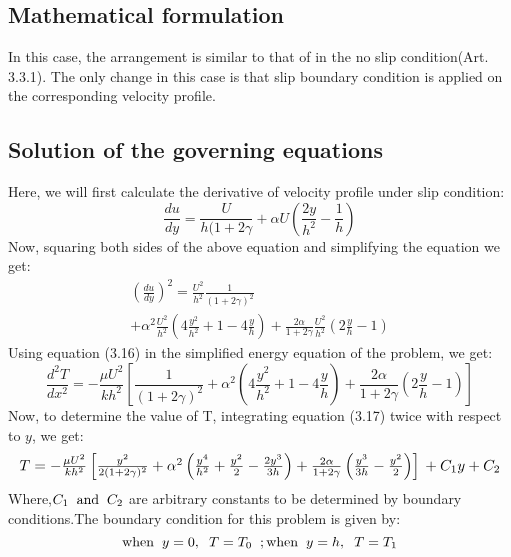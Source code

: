 \documentclass[14pt,one side, a4paper]{extbook}
\begin{document}
	 	\subsection{Mathematical formulation}
	 	In this case, the arrangement is similar to that of in the no slip condition(Art. 3.3.1). The only change in this case is that slip boundary condition is applied on the corresponding velocity profile.
	 	\subsection{Solution of the governing equations} Here, we will first calculate the derivative of velocity profile under slip condition:
	 	\begin{equation}
	 		\frac{du}{dy}=\frac{U}{h(1+2\gamma}+\alpha U\left(\frac{2y}{h^{2}}-\frac{1}{h}\right)
	 	\end{equation}
	 	 Now, squaring both sides of the above equation and simplifying the equation we get:
	 	 \begin{multline}
	 	 	\left(\frac{du}{dy}\right)^{2}=\frac{U^{2}}{h^{2}}\frac{1}{(1+2\gamma)^{2}} \\ +\alpha^{2}\frac{U^{2}}{h^{2}}\left(4\frac{y^{2}}{h^{2}}+1-4\frac{y}{h}\right)+\frac{2\alpha}{1+2\gamma}\frac{U^{2}}{h^{2}}\left(2\frac{y}{h}-1\right)
	 	 \end{multline}
	 	 Using equation (3.16) in the simplified energy equation of the problem, we get:
	 	 \begin{equation}
	 	 \frac{d^{2}T}{d x^{2}}=-\frac{\mu U^{2}}{kh^{2}}\left[\frac{1}{(1+2\gamma)^{2}}+\alpha^{2}\left(4\frac{y^{2}}{h^{2}}+1-4\frac{y}{h}\right)+\frac{2\alpha}{1+2\gamma}\left(2\frac{y}{h}-1\right)\right]
	 	\end{equation}
	 	Now, to determine the value of T, integrating equation (3.17) twice with respect to $y$, we get:
	 	\begin{equation}
	 				\resizebox{1\hsize}{!}{$T=-\frac{\mu U^{2}}{kh^{2}}\left[\frac{y^{2}}{2(1+2\gamma )^{2}}+ \alpha ^{2}\left(\frac{y^{4}}{h^{2}}+\frac{y^{2}}{2}-\frac{2y^{3}}{3h}\right)+\frac{2\alpha}{1+2\gamma}\left(\frac{y^{3}}{3h}-\frac{y^{2}}{2}\right)\right]\\+C_{1}y+C_{2}$}
	 	\end{equation}
	 	Where,$C_{1}\hspace*{0.2cm}\textrm{and}\hspace*{0.2cm} C_{2}$ are arbitrary constants to be determined by boundary conditions.The boundary condition for this problem is given by:
	 		\begin{equation}
	 		\textrm{when}\hspace*{0.2cm} y=0,\hspace*{0.2cm}T=T_{0}\hspace{0.2cm};\textrm{when}\hspace*{0.2cm} y=h,\hspace*{0.2cm} T=T_{1}
	 	\end{equation}
\end{document}
